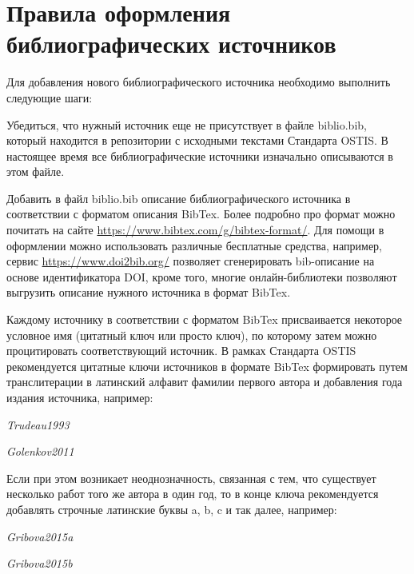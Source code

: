 \section*{Правила оформления библиографических источников}

Для добавления нового библиографического источника необходимо выполнить следующие шаги:
\begin{textitemize}
	\item Убедиться, что нужный источник еще не присутствует в файле biblio.bib, который находится в репозитории с исходными текстами Стандарта OSTIS. В настоящее время все библиографические источники изначально описываются в этом файле.
	\item Добавить в файл biblio.bib описание библиографического источника в соответствии с форматом описания BibTex. Более подробно про формат можно почитать на сайте \url{https://www.bibtex.com/g/bibtex-format/}. Для помощи в оформлении можно использовать различные бесплатные средства, например, сервис \url{https://www.doi2bib.org/} позволяет сгенерировать bib-описание на основе идентификатора DOI, кроме того, многие онлайн-библиотеки позволяют выгрузить описание нужного источника в формат BibTex.
	\item Каждому источнику в соответствии с форматом BibTex присваивается некоторое условное имя (цитатный ключ или просто ключ), по которому затем можно процитировать соответствующий источник. В рамках Стандарта OSTIS рекомендуется цитатные ключи источников в формате BibTex формировать путем транслитерации в латинский алфавит фамилии первого автора и добавления года издания источника, например:
	
	\begin{textitemize}
		\item \textit{Trudeau1993}
		\item \textit{Golenkov2011}
	\end{textitemize}
	
	Если при этом возникает неоднозначность, связанная с тем, что существует несколько работ того же автора в один год, то в конце ключа рекомендуется добавлять строчные латинские буквы a, b, c и так далее, например:
	
	\begin{textitemize}
		\item \textit{Gribova2015a}
		\item \textit{Gribova2015b}
	\end{textitemize}
	

\end{textitemize}
